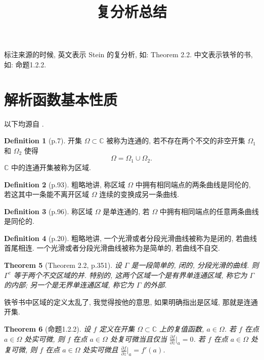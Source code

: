 \documentclass[a4paper,11pt]{article}
\title{复分析总结}
\newtheorem{theorem}{Theorem}[section]
\theoremstyle{definition}
\newtheorem{definition}[theorem]{Definition}
\begin{document}
\begin{CJK*}{UTF8}{gbsn}

\maketitle

标注来源的时候, 英文表示 Stein 的复分析, 如: Theorem 2.2. 中文表示铁爷的书, 如: 命题1.2.2.

\section{解析函数基本性质}

以下均源自 \cite{ss10}.

\begin{definition}[p.7]
    开集 $ \Omega \subset \mathbb{C} $ 被称为连通的, 若不存在两个不交的非空开集 $ \Omega_1 $ 和 $ \Omega_2 $ 使得
    $$
        \Omega = \Omega_1 \cup \Omega_2.
    $$
    $ \mathbb{C} $ 中的连通开集被称为区域.
\end{definition}

\begin{definition}[p.93]
    粗略地讲, 
    称区域 $ \Omega $ 中拥有相同端点的两条曲线是同伦的, 若这其中一条能不离开区域 $ \Omega $ 连续的变换成另一条曲线.
\end{definition}

\begin{definition}[p.96]
    称区域 $ \Omega $ 是单连通的, 若 $ \Omega $ 中拥有相同端点的任意两条曲线是同伦的.
\end{definition}


\begin{definition}[p.20]
    粗略地讲, 
    一个光滑或者分段光滑曲线被称为是闭的, 若曲线首尾相连.    
    一个光滑或者分段光滑曲线被称为是简单的, 若曲线不自交.
\end{definition}

\begin{theorem}[Theorem 2.2, p.351]
    设 $ \Gamma $ 是一段简单的, 闭的, 分段光滑的曲线. 则 $ \Gamma^c $ 等于两个不交区域的并. 
    特别的, 这两个区域一个是有界单连通区域, 称它为 $ \Gamma $ 的内部;
    另一个是无界单连通区域, 称它为 $ \Gamma $ 的外部.
\end{theorem}

铁爷书中区域的定义太乱了, 我觉得按他的意思, 如果明确指出是区域, 那就是连通开集.

\begin{theorem}[命题1.2.2]
    设 $ f $ 定义在开集 $ \Omega \subset \mathbb{C} $ 上的复值函数, $ a \in \Omega $. 
    若 $ f $ 在点 $ a \in \Omega $ 处实可微, 
    则 $ f $ 在点 $ a \in \Omega $ 处复可微当且仅当 $ \frac{\partial f}{\partial \overline{z}}|_a = 0 $.
    若 $ f $ 在点 $ a \in \Omega $ 处复可微, 
    则 $ f $ 在点 $ a \in \Omega $ 处实可微且 $ \frac{\partial f}{\partial z}|_a = f'(a) $.
\end{theorem}


\end{CJK*}
\end{document}

